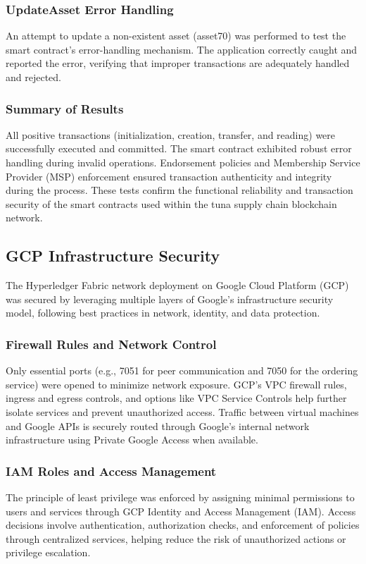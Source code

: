 \subsubsection{UpdateAsset Error Handling}
An attempt to update a non-existent asset (asset70) was performed to test the smart contract’s error-handling mechanism. The application correctly caught and reported the error, verifying that improper transactions are adequately handled and rejected.

\subsubsection{Summary of Results}
All positive transactions (initialization, creation, transfer, and reading) were successfully executed and committed. The smart contract exhibited robust error handling during invalid operations. Endorsement policies and Membership Service Provider (MSP) enforcement ensured transaction authenticity and integrity during the process. These tests confirm the functional reliability and transaction security of the smart contracts used within the tuna supply chain blockchain network.

\subsection{GCP Infrastructure Security}
The Hyperledger Fabric network deployment on Google Cloud Platform (GCP) was secured by leveraging multiple layers of Google's infrastructure security model, following best practices in network, identity, and data protection.

\subsubsection{Firewall Rules and Network Control}
Only essential ports (e.g., 7051 for peer communication and 7050 for the ordering service) were opened to minimize network exposure. GCP’s VPC firewall rules, ingress and egress controls, and options like VPC Service Controls help further isolate services and prevent unauthorized access. Traffic between virtual machines and Google APIs is securely routed through Google’s internal network infrastructure using Private Google Access when available.

\subsubsection{IAM Roles and Access Management}
The principle of least privilege was enforced by assigning minimal permissions to users and services through GCP Identity and Access Management (IAM). Access decisions involve authentication, authorization checks, and enforcement of policies through centralized services, helping reduce the risk of unauthorized actions or privilege escalation.

